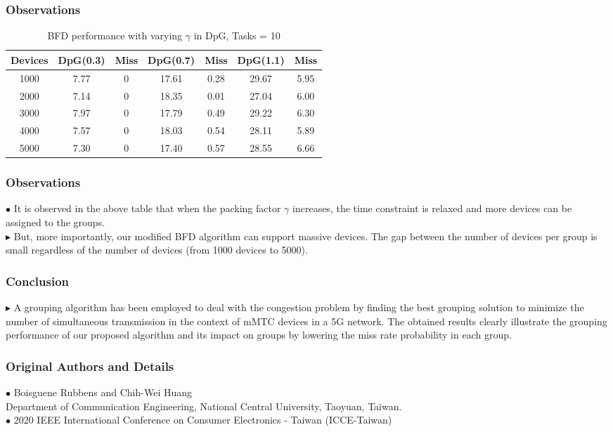 \documentclass{beamer}
\begin{document}
\begin{frame}
\frametitle{Observations}
\begin{table}[h!]
  \begin{center}
    \begin{tabular}{||c|c|c|c|c|c|c||}
    \hline 
    Devices&DpG(0.3)&Miss&DpG(0.7)&Miss&DpG(1.1)&Miss\\
    \hline
    \hline
    1000 & 7.77 & 0 & 17.61 & 0.28 & 29.67 & 5.95\\
    \hline
    2000 & 7.14 & 0 & 18.35 & 0.01 & 27.04 & 6.00\\
    \hline
	3000 & 7.97 & 0 & 17.79 & 0.49 & 29.22 & 6.30\\
	\hline
	4000 & 7.57 & 0 & 18.03 & 0.54 & 28.11 & 5.89\\
	\hline
    5000 & 7.30 & 0 & 17.40 & 0.57 & 28.55 & 6.66\\
	\hline
    \end{tabular}
  \end{center}
  \label{Table:3}
  \caption{BFD performance with varying $\gamma$ in DpG, Tasks = 10}
\end{table}

\end{frame}


\begin{frame}
\frametitle{Observations}
$\bullet$ It is observed in the above table that when the packing factor $\gamma$ increases, the time constraint is relaxed and more devices can be assigned to the groups.\\
$\blacktriangleright$ But, more importantly, our modified BFD algorithm can support massive devices. The gap between the number of devices per group is small regardless of the number of devices (from 1000 devices to 5000).
\end{frame}


\begin{frame}
\frametitle{Conclusion}
$\blacktriangleright$ A grouping algorithm has been employed to deal with the congestion problem by finding the best grouping solution to minimize the number of simultaneous transmission in the context of mMTC devices in a 5G network. The obtained results clearly illustrate the grouping performance of our proposed algorithm and its impact on groups by lowering the miss rate probability in each group.
\end{frame}

\begin{frame}
\frametitle{Original Authors and Details}
$\bullet$ Boisguene Rubbens and Chih-Wei Huang
\\Department of Communication Engineering, National Central University, Taoyuan, Taiwan.\\
$\bullet$ 2020 IEEE International Conference on Consumer Electronics
- Taiwan (ICCE-Taiwan)
\end{frame}
\end{document}
